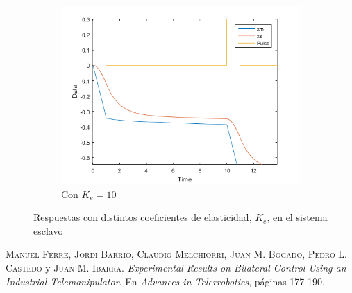 \documentclass[a4paper, fontsize=11pt]{scrartcl} %
\numberwithin{equation}{section} %
\numberwithin{figure}{section} %
\numberwithin{table}{section} %
\begin{document}
\begin{figure}[h!]
\begin{subfigure}[t]{.5\textwidth}
			\includegraphics[width=1\linewidth]{images/Ke10.PNG}
			\caption{Con $K_e = 10$}
			\label{Ke10-FP}
		\end{subfigure}
		\caption{Respuestas con distintos coeficientes de elasticidad, $K_e$, en el sistema esclavo}
		\label{Slave_Stifnes-FP}
	\end{figure}
	\FloatBarrier
	
	 
	
	\begin{thebibliography}{X}
		
		 \textsc{Manuel Ferre, Jordi Barrio, Claudio Melchiorri, Juan M. Bogado, Pedro L. Castedo} y \textsc{Juan M. Ibarra}. \textit{Experimental Results on Bilateral Control Using an Industrial Telemanipulator}. En \textit{Advances in Telerrobotics}, páginas 177-190.
		
	
		
	\end{thebibliography}
	
\end{document}
